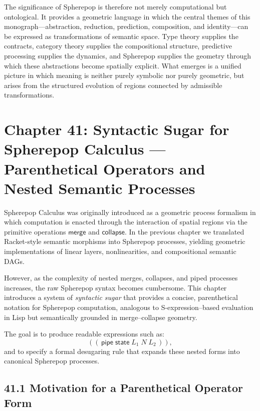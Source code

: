 \documentclass[12pt,letterpaper]{article}
\theoremstyle{remark}
\begin{document}
The significance of Spherepop is therefore not merely computational but ontological. It provides a geometric language in which the central themes of this monograph—abstraction, reduction, prediction, composition, and identity—can be expressed as transformations of semantic space. Type theory supplies the contracts, category theory supplies the compositional structure, predictive processing supplies the dynamics, and Spherepop supplies the geometry through which these abstractions become spatially explicit. What emerges is a unified picture in which meaning is neither purely symbolic nor purely geometric, but arises from the structured evolution of regions connected by admissible transformations.

\newpage

\section{Chapter 41: Syntactic Sugar for Spherepop Calculus —  
Parenthetical Operators and Nested Semantic Processes}

Spherepop Calculus was originally introduced as a geometric process formalism in which computation is enacted through the interaction of spatial regions via the primitive operations $\mathsf{merge}$ and $\mathsf{collapse}$. In the previous chapter we translated Racket-style semantic morphisms into Spherepop processes, yielding geometric implementations of linear layers, nonlinearities, and compositional semantic DAGs.

However, as the complexity of nested merges, collapses, and piped processes increases, the raw Spherepop syntax becomes cumbersome. This chapter introduces a system of \emph{syntactic sugar} that provides a concise, parenthetical notation for Spherepop computation, analogous to S-expression–based evaluation in Lisp but semantically grounded in merge--collapse geometry.

The goal is to produce readable expressions such as:
\[
((\,\mathsf{pipe}\; \mathsf{state}\; L_1\; N\; L_2\,)),
\]
and to specify a formal desugaring rule that expands these nested forms into canonical Spherepop processes.

\subsection{41.1 Motivation for a Parenthetical Operator Form}
\end{document}
